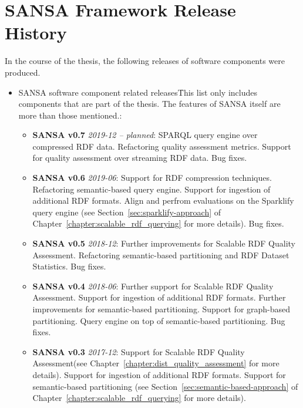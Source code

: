\chapter{SANSA Framework Release History}
\label{sec:appendix-sansa-releases}

In the course of the thesis, the following releases of software components were produced.

\begin{itemize}
    \item SANSA software component related releases\f{This list only includes components that are part of the thesis. 
    The features of SANSA itself are more than those mentioned.}:
    \begin{itemize}
        
        \item \textbf{SANSA v0.7} \textit{2019-12 -- planned}:
        SPARQL query engine over compressed RDF data.
        Refactoring quality assessment metrics.
        Support for quality assessment over streaming RDF data.
        Bug fixes.
        
        \item \textbf{SANSA v0.6} \textit{2019-06}:
        Support for RDF compression techniques.
        Refactoring semantic-based query engine.
        Support for ingestion of additional RDF formats.
        Align and perfrom evaluations on the Sparklify query engine (see Section~\ref{sec:sparklify-approach} of Chapter~\ref{chapter:scalable_rdf_querying} for more details).
        Bug fixes.
        
        \item \textbf{SANSA v0.5} \textit{2018-12}: 
        Further improvements for Scalable RDF Quality Assessment. 
        Refactoring semantic-based partitioning and RDF Dataset Statistics.
        Bug fixes.
        
        \item \textbf{SANSA v0.4} \textit{2018-06}:
        Further support for Scalable RDF Quality Assessment. 
        Support for ingestion of additional RDF formats.
        Further improvements for semantic-based partitioning.
        Support for graph-based partitioning.
        Query engine on top of semantic-based partitioning.
        Bug fixes.
        
        \item \textbf{SANSA v0.3} \textit{2017-12}: 
        Support for Scalable RDF Quality Assessment(see Chapter~\ref{chapter:dist_quality_assessment} for more details). 
        Support for ingestion of additional RDF formats.
        Support for semantic-based partitioning (see Section~\ref{sec:semantic-based-approach} of Chapter~\ref{chapter:scalable_rdf_querying} for more details).
        

\end{itemize}
\end{itemize}

